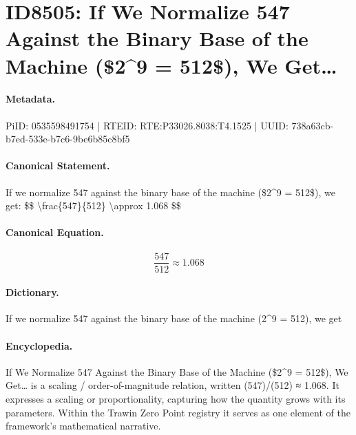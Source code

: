 \section*{ID8505: If We Normalize 547 Against the Binary Base of the Machine (\$2\textasciicircum{}9 = 512\$), We Get…}
\paragraph{Metadata.}
PiID: 0535598491754 | RTEID: RTE:P33026.8038:T4.1525 | UUID: 738a63cb-b7ed-533e-b7c6-9be6b85c8bf5

\paragraph{Canonical Statement.}
If we normalize 547 against the binary base of the machine (\$2\textasciicircum{}9 = 512\$), we get: \$\$ \textbackslash{}frac\{547\}\{512\} \textbackslash{}approx 1.068 \$\$

\paragraph{Canonical Equation.}
\[
\frac{547}{512} \approx 1.068
\]

\paragraph{Dictionary.}
If we normalize 547 against the binary base of the machine (2\textasciicircum{}9 = 512), we get

\paragraph{Encyclopedia.}
If We Normalize 547 Against the Binary Base of the Machine (\$2\textasciicircum{}9 = 512\$), We Get… is a scaling / order-of-magnitude relation, written (547)/(512) ≈ 1.068. It expresses a scaling or proportionality, capturing how the quantity grows with its parameters. Within the Trawin Zero Point registry it serves as one element of the framework's mathematical narrative.
